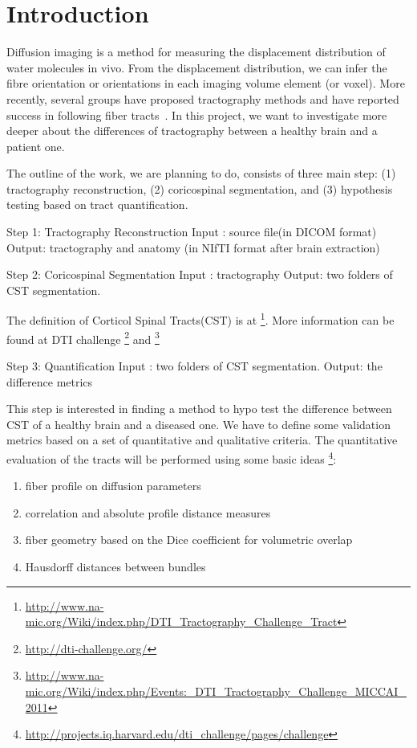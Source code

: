 
\section{Introduction}
\label{sec:introduction}
Diffusion imaging is a method for measuring the displacement distribution of water molecules in vivo. From the displacement distribution, we can infer the fibre orientation or orientations in each imaging volume element (or voxel). More recently, several groups have proposed tractography methods and have reported success in following fiber tracts~\cite{zhang2008identifying}. In this project, we want to investigate more deeper about the differences of tractography between a healthy brain and a patient one. 

The outline of the work, we are planning to do, consists of three main step: (1) tractography reconstruction, (2) coricospinal segmentation, and (3) hypothesis testing based on tract quantification.
\begin{python}
Step 1: Tractography Reconstruction
	Input : source file(in DICOM format)
	Output: tractography and anatomy 
	       (in NIfTI format after brain extraction)
\end{python}

\begin{python}
Step 2: Coricospinal Segmentation
	Input : tractography
	Output: two folders of CST segmentation.
\end{python}
The definition of Corticol Spinal Tracts(CST) is at \footnote{\url{http://www.na-mic.org/Wiki/index.php/DTI_Tractography_Challenge_Tract}}. More information can be found at DTI challenge \footnote{\url{http://dti-challenge.org/}} and \footnote{\url{http://www.na-mic.org/Wiki/index.php/Events:_DTI_Tractography_Challenge_MICCAI_2011}}

\begin{python}
Step 3: Quantification
	Input : two folders of CST segmentation.
	Output: the difference metrics
\end{python}

This step is interested in finding a method to hypo test the difference between CST of a healthy brain and a diseased one. We have to define some validation metrics based on a set of quantitative and qualitative criteria. The quantitative evaluation of the tracts will be performed using some basic ideas \footnote{\url{http://projects.iq.harvard.edu/dti_challenge/pages/challenge}}:
\begin{enumerate}
\item fiber profile on diffusion parameters
\item correlation and absolute profile distance measures
\item fiber geometry based on the Dice coefficient for volumetric overlap
\item Hausdorff distances between bundles
\end{enumerate}


